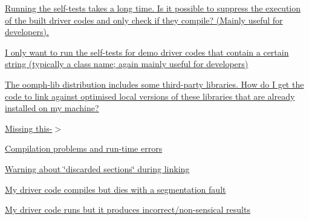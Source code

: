 \begin{DoxyItemize}
\begin{DoxyItemize}
\item \hyperlink{index_only_compile_dont_run}{Running the self-\/tests takes a long time. Is it possible to suppress the execution of the built driver codes and only check if they compile? (Mainly useful for developers).} ~\newline
~\newline

\item \hyperlink{index_grep_run}{I only want to run the self-\/tests for demo driver codes that contain a certain string (typically a class name; again mainly useful for developers)} ~\newline
~\newline

\item \hyperlink{index_link}{The oomph-\/lib distribution includes some third-\/party libraries. How do I get the code to link against optimised local versions of these libraries that are already installed on my machine?} ~\newline
~\newline

\item \hyperlink{index_missing_this}{Missing \textquotesingle{}this-\/$>$\textquotesingle{}} ~\newline
~\newline

\end{DoxyItemize}
\item \hyperlink{index_compilation_and_seg}{Compilation problems and run-\/time errors} ~\newline
~\newline

\begin{DoxyItemize}
\item \hyperlink{index_rodata}{Warning about \char`\"{}discarded sections\char`\"{} during linking} ~\newline
~\newline

\item \hyperlink{index_seg_fault}{My driver code compiles but dies with a segmentation fault} ~\newline
~\newline

\item \hyperlink{index_wrong_results}{My driver code runs but it produces incorrect/non-\/sensical results} ~\newline
~\newline


\end{DoxyItemize}
\end{DoxyItemize}
